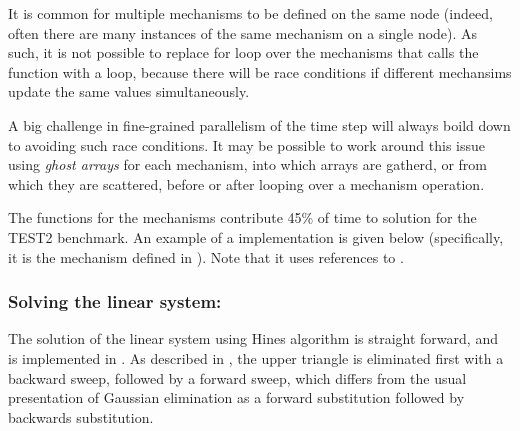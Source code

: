 
It is common for multiple mechanisms to be defined on the same node (indeed, often there are many instances of the same mechanism on a single node). As such, it is not possible to replace for loop over the mechanisms that calls the  function with a  loop, because there will be race conditions if different mechansims update the same  values simultaneously.

\begin{note}
A big challenge in fine-grained parallelism of the time step will always boild down to avoiding such race conditions. It may be possible to work around this issue using \emph{ghost arrays} for each mechanism, into which  arrays are gatherd, or from which they are scattered, before or after looping over a mechanism operation.
\end{note}

The  functions for the mechanisms contribute 45\% of time to solution for the TEST2 benchmark. An  example of a  implementation is given below (specifically, it is the mechanism defined in ). Note that it uses references to .


\subsubsection{Solving the linear system: }
The solution of the linear system using Hines algorithm is straight forward, and is implemented in . As described in , the upper triangle is eliminated first with a backward sweep, followed by a forward sweep, which differs from the usual presentation of Gaussian elimination as a forward substitution followed by backwards substitution.


